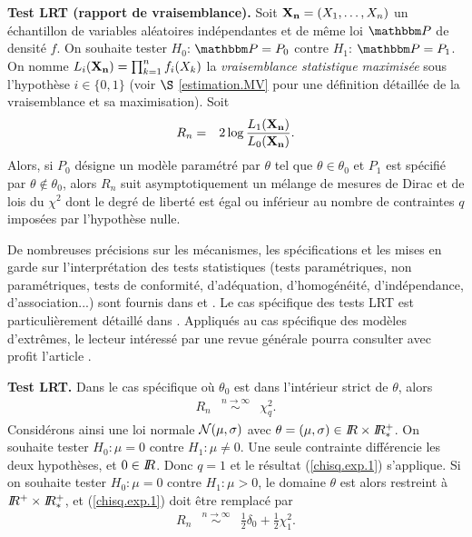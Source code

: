 \begin{theorem}\label{test.lrt}{\bf Test LRT (rapport de vraisemblance).}
Soit ${\bf X_n}=(X_1,\ldots,X_n)$ un \'echantillon de variables al\'eatoires ind\'ependantes et de m\^eme loi $\Pm$ de densit\'e $f$. On souhaite tester $H_0$: $\Pm=P_0$ contre $H_1$: $\Pm=P_1$. On nomme $L_i({\bf X_n})=\prod_{k=1}^n f_i(X_k)$ la {\it vraisemblance statistique maximis\'ee} sous l'hypoth\`ese $i\in\{0,1\}$ (voir $\S$ \ref{estimation.MV} pour une d\'efinition d\'etaill\'ee de la vraisemblance et sa maximisation). Soit
\begin{eqnarray*}
R_n & = & 2\log \frac{L_1({\bf X_n})}{L_0({\bf X_n})}.
\end{eqnarray*}  
Alors, si $P_0$ d\'esigne un mod\`ele param\'etr\'e par $\theta$ tel que $\theta\in\theta_0$ et $P_1$ est sp\'ecifi\'e par $\theta\notin\theta_0$, alors $R_n$ suit asymptotiquement un m\'elange de mesures de Dirac et de lois du $\chi^2$ dont le degr\'e de libert\'e est \'egal ou inf\'erieur au nombre de contraintes $q$ impos\'ees par l'hypoth\`ese nulle. \\
\end{theorem}

De nombreuses pr\'ecisions sur les m\'ecanismes, les sp\'ecifications et les mises en garde sur l'interpr\'etation des tests statistiques (tests param\'etriques, non param\'etriques, tests de conformit\'e, d'ad\'equation, d'homog\'en\'eit\'e, d'ind\'ependance, d'association...) sont fournis dans \cite{Saporta2006} et \cite{Greenland2016}. Le cas sp\'ecifique des tests LRT est particuli\`erement d\'etaill\'e dans \cite{Gourerioux1996}. Appliqu\'es au cas sp\'ecifique des mod\`eles d'extr\^emes, le lecteur int\'eress\'e par une revue g\'en\'erale pourra consulter avec profit l'article \cite{Neves2008}. \\

\begin{exo}\label{ex.tests.LRT}{\bf Test LRT.}   Dans le cas sp\'ecifique o\`u $\theta_0$ est dans l'int\'erieur strict de $\theta$, alors
\begin{eqnarray}
R_n & \overset{n\to\infty} \sim & \chi^2_q. \label{chisq.exp.1}
\end{eqnarray}
Consid\'erons ainsi une loi normale ${\cal{N}}(\mu,\sigma)$ avec $\theta=(\mu,\sigma)\in I\!\!R\times I\!\!R^+_*$. On souhaite tester $H_0:\mu=0$ contre $H_1:\mu \neq 0$. Une seule contrainte diff\'erencie les deux hypoth\`eses, et $0\in I\!\!R$. Donc $q=1$ et le r\'esultat (\ref{chisq.exp.1}) s'applique. 
Si on souhaite tester $H_0:\mu=0$ contre $H_1:\mu > 0$, le domaine $\theta$ est alors restreint \`a $I\!\!R^+\times I\!\!R^+_*$, et (\ref{chisq.exp.1}) doit \^etre remplac\'e par 
\begin{eqnarray*}
R_n & \overset{n\to\infty} \sim & \frac{1}{2}\delta_0 + \frac{1}{2}\chi^2_1.  
\end{eqnarray*} 
\end{exo}


